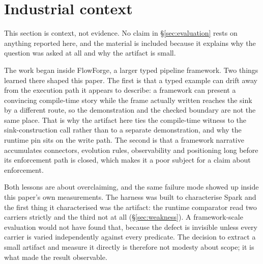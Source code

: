 \section{Industrial context}
\label{sec:context}

This section is context, not evidence. No claim in \S\ref{sec:evaluation} rests on anything reported here, and the material is included because it explains why the question was asked at all and why the artifact is small.

The work began inside FlowForge, a larger typed pipeline framework. Two things learned there shaped this paper. The first is that a typed example can drift away from the execution path it appears to describe: a framework can present a convincing compile-time story while the frame actually written reaches the sink by a different route, so the demonstration and the checked boundary are not the same place. That is why the artifact here ties the compile-time witness to the sink-construction call rather than to a separate demonstration, and why the runtime pin sits on the write path. The second is that a framework narrative accumulates connectors, evolution rules, observability and positioning long before its enforcement path is closed, which makes it a poor subject for a claim about enforcement.

Both lessons are about overclaiming, and the same failure mode showed up inside this paper's own measurements. The harness was built to characterise Spark and the first thing it characterised was the artifact: the runtime comparator read two carriers strictly and the third not at all (\S\ref{sec:weakness}). A framework-scale evaluation would not have found that, because the defect is invisible unless every carrier is varied independently against every predicate. The decision to extract a small artifact and measure it directly is therefore not modesty about scope; it is what made the result observable.
